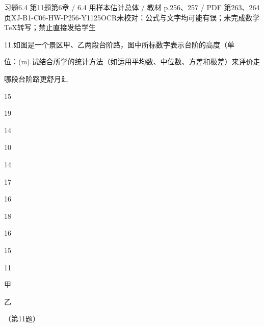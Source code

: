 \begin{bankitem}{习题6.4 第11题}{第6章 / 6.4 用样本估计总体 / 教材 p.256、257 / PDF 第263、264页}{XJ-B1-C06-HW-P256-Y1125}{OCR未校对：公式与文字均可能有误；未完成数学TeX转写；禁止直接发给学生}
\begin{ocrdraft}
\par
11.如图是一个景区甲、乙两段台阶路，图中所标数字表示台阶的高度（单
\par
位：(m).试结合所学的统计方法（如运用平均数、中位数、方差和极差）来评价走
\par
哪段台阶路更舒月廴
\par
15
\par
19
\par
14
\par
10
\par
14
\par
17
\par
16
\par
18
\par
16
\par
15
\par
11
\par
甲
\par
乙
\par
（第11题）
\par
[教材p.257 / PDF第264页]
\end{ocrdraft}
\end{bankitem}
